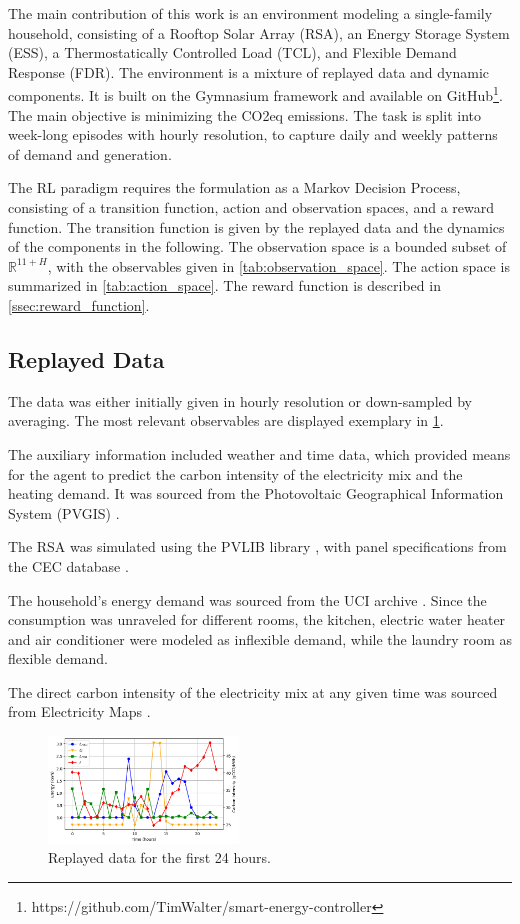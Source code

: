 The main contribution of this work is an environment modeling a single-family household, consisting of a Rooftop Solar Array (RSA), an Energy Storage System (ESS), a Thermostatically Controlled Load (TCL), and Flexible Demand Response (FDR). The environment is a mixture of replayed data and dynamic components. It is built on the Gymnasium framework \cite{Towers.2023} and available on GitHub\footnote{https://github.com/TimWalter/smart-energy-controller}. The main objective is minimizing the CO2eq emissions. The task is split into week-long episodes with hourly resolution, to capture daily and weekly patterns of demand and generation.
\par
The RL paradigm requires the formulation as a Markov Decision Process, consisting of a transition function, action and observation spaces, and a reward function. The transition function is given by the replayed data and the dynamics of the components in the following. The observation space is a bounded subset of $\mathbb{R}^{11+H}$, with the observables given in \cref{tab:observation_space}. The action space is summarized in  \cref{tab:action_space}. The reward function is described in \cref{ssec:reward_function}.

\subsection{Replayed Data}\label{ssec:static_components}
The data was either initially given in hourly resolution or down-sampled by averaging. The most relevant observables are displayed exemplary in \cref{fig:static_components}.
\par
The auxiliary information included weather and time data, which provided means for the agent to predict the carbon intensity of the electricity mix and the heating demand. It was sourced from the Photovoltaic Geographical Information System (PVGIS) \cite{ThomasHuld.2012}.
\par
The RSA was simulated using the PVLIB library \cite{F.Holmgren.2018}, with panel specifications from the CEC database \cite{Dobos.2012}\cite{Boyson.2007}.
\par
The household's energy demand was sourced from the UCI archive \cite{GeorgesHebrail.2006}. Since the consumption was unraveled for different rooms, the kitchen, electric water heater and air conditioner were modeled as inflexible demand, while the laundry room as flexible demand.
\par
The direct carbon intensity of the electricity mix at any given time was sourced from Electricity Maps \cite{ElectricityMaps.2023}. 
\begin{figure}[H]
    \centering
    \setlength{\abovecaptionskip}{0pt}
    \includegraphics[width=0.45\textwidth]{figures/static_components.png}
    \caption{Replayed data for the first 24 hours.}
    \label{fig:static_components}
\end{figure}

